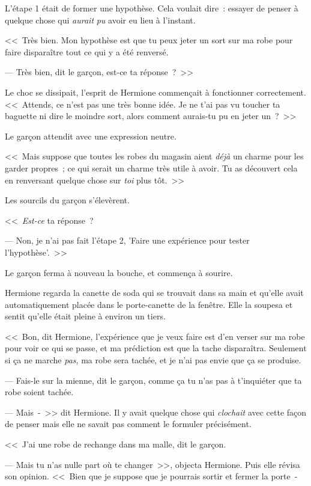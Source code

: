 L'étape 1 était de former une hypothèse. Cela voulait dire~: essayer de penser à quelque chose qui \emph{aurait} \emph{pu} avoir eu lieu à l'instant.

<<~Très bien. Mon hypothèse est que tu peux jeter un sort sur ma robe pour faire disparaître tout ce qui y a été renversé.

--- Très bien, dit le garçon, est-ce ta réponse~?~>>

Le choc se dissipait, l'esprit de Hermione commençait à fonctionner correctement. <<~Attends, ce n'est pas une très bonne idée. Je ne t'ai pas vu toucher ta baguette ni dire le moindre sort, alors comment aurais-tu pu en jeter un~?~>>

Le garçon attendit avec une expression neutre.

<<~Mais suppose que toutes les robes du magasin aient \emph{déjà} un charme pour les garder propres~; ce qui serait un charme très utile à avoir. Tu as découvert cela en renversant quelque chose sur \emph{toi} plus tôt.~>>

Les sourcils du garçon s'élevèrent.

<<~\emph{Est-ce} ta réponse~?

--- Non, je n'ai pas fait l'étape 2, 'Faire une expérience pour tester l'hypothèse'.~>>

Le garçon ferma à nouveau la bouche, et commença à sourire.

Hermione regarda la canette de soda qui se trouvait dans sa main et qu'elle avait automatiquement placée dans le porte-canette de la fenêtre. Elle la soupesa et sentit qu'elle était pleine à environ un tiers.

<<~Bon, dit Hermione, l'expérience que je veux faire est d'en verser sur ma robe pour voir ce qui se passe, et ma prédiction est que la tache disparaîtra. Seulement si ça ne marche \emph{pas}, ma robe sera tachée, et je n'ai pas envie que ça se produise.

--- Fais-le sur la mienne, dit le garçon, comme ça tu n'as pas à t'inquiéter que ta robe soient tachée.

--- Mais~-~>> dit Hermione. Il y avait quelque chose qui \emph{clochait} avec cette façon de penser mais elle ne savait pas comment le formuler précisément.

<<~J'ai une robe de rechange dans ma malle, dit le garçon.

--- Mais tu n'as nulle part où te changer~>>, objecta Hermione. Puis elle révisa son opinion. <<~Bien que je suppose que je pourrais sortir et fermer la porte~-

